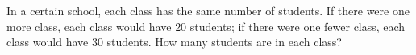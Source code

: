 In a certain school, each class has the same number of students. If there were one more class, each class would have $20$ students; if there were one fewer class, each class would have $30$ students. How many students are in each class?
